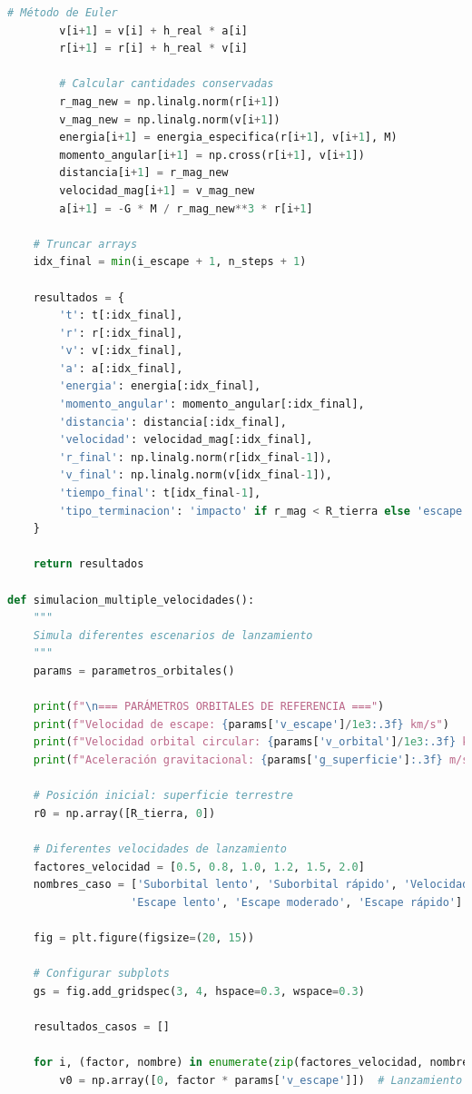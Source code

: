 \documentclass{article}
\begin{document}
\begin{lstlisting}[language=Python, caption={Análisis completo del sistema Tierra-nave}]
        # Método de Euler
        v[i+1] = v[i] + h_real * a[i]
        r[i+1] = r[i] + h_real * v[i]
        
        # Calcular cantidades conservadas
        r_mag_new = np.linalg.norm(r[i+1])
        v_mag_new = np.linalg.norm(v[i+1])
        energia[i+1] = energia_especifica(r[i+1], v[i+1], M)
        momento_angular[i+1] = np.cross(r[i+1], v[i+1])
        distancia[i+1] = r_mag_new
        velocidad_mag[i+1] = v_mag_new
        a[i+1] = -G * M / r_mag_new**3 * r[i+1]
    
    # Truncar arrays
    idx_final = min(i_escape + 1, n_steps + 1)
    
    resultados = {
        't': t[:idx_final],
        'r': r[:idx_final],
        'v': v[:idx_final],
        'a': a[:idx_final],
        'energia': energia[:idx_final],
        'momento_angular': momento_angular[:idx_final],
        'distancia': distancia[:idx_final],
        'velocidad': velocidad_mag[:idx_final],
        'r_final': np.linalg.norm(r[idx_final-1]),
        'v_final': np.linalg.norm(v[idx_final-1]),
        'tiempo_final': t[idx_final-1],
        'tipo_terminacion': 'impacto' if r_mag < R_tierra else 'escape' if r_mag > 50*R_tierra else 'normal'
    }
    
    return resultados

def simulacion_multiple_velocidades():
    """
    Simula diferentes escenarios de lanzamiento
    """
    params = parametros_orbitales()
    
    print(f"\n=== PARÁMETROS ORBITALES DE REFERENCIA ===")
    print(f"Velocidad de escape: {params['v_escape']/1e3:.3f} km/s")
    print(f"Velocidad orbital circular: {params['v_orbital']/1e3:.3f} km/s")
    print(f"Aceleración gravitacional: {params['g_superficie']:.3f} m/s²")
    
    # Posición inicial: superficie terrestre
    r0 = np.array([R_tierra, 0])
    
    # Diferentes velocidades de lanzamiento
    factores_velocidad = [0.5, 0.8, 1.0, 1.2, 1.5, 2.0]
    nombres_caso = ['Suborbital lento', 'Suborbital rápido', 'Velocidad escape', 
                   'Escape lento', 'Escape moderado', 'Escape rápido']
    
    fig = plt.figure(figsize=(20, 15))
    
    # Configurar subplots
    gs = fig.add_gridspec(3, 4, hspace=0.3, wspace=0.3)
    
    resultados_casos = []
    
    for i, (factor, nombre) in enumerate(zip(factores_velocidad, nombres_caso)):
        v0 = np.array([0, factor * params['v_escape']])  # Lanzamiento vertical
        

\end{lstlisting}
\end{document}
